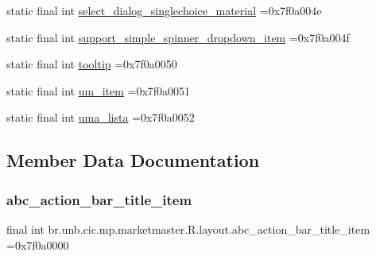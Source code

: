 \begin{DoxyCompactItemize}
\item 
static final int \mbox{\hyperlink{classbr_1_1unb_1_1cic_1_1mp_1_1marketmaster_1_1R_1_1layout_a025d0448cf81d6878b64e51ab758f593}{select\+\_\+dialog\+\_\+singlechoice\+\_\+material}} =0x7f0a004e
\item 
static final int \mbox{\hyperlink{classbr_1_1unb_1_1cic_1_1mp_1_1marketmaster_1_1R_1_1layout_aab7e49c1acca9fdcf3c587500861830a}{support\+\_\+simple\+\_\+spinner\+\_\+dropdown\+\_\+item}} =0x7f0a004f
\item 
static final int \mbox{\hyperlink{classbr_1_1unb_1_1cic_1_1mp_1_1marketmaster_1_1R_1_1layout_a1d2502abddc92a65cce33090859334ae}{tooltip}} =0x7f0a0050
\item 
static final int \mbox{\hyperlink{classbr_1_1unb_1_1cic_1_1mp_1_1marketmaster_1_1R_1_1layout_a4d6e586bee5d7224e2622898043a77c9}{um\+\_\+item}} =0x7f0a0051
\item 
static final int \mbox{\hyperlink{classbr_1_1unb_1_1cic_1_1mp_1_1marketmaster_1_1R_1_1layout_ac184cd4c6a865b6bb98bbc9eb0930937}{uma\+\_\+lista}} =0x7f0a0052
\end{DoxyCompactItemize}


\subsection{Member Data Documentation}
\mbox{\label{classbr_1_1unb_1_1cic_1_1mp_1_1marketmaster_1_1R_1_1layout_abb300bac2183fcb747a8d5a79fbac7f8}} 
\subsubsection{\texorpdfstring{abc\+\_\+action\+\_\+bar\+\_\+title\+\_\+item}{abc\_action\_bar\_title\_item}}
{\footnotesize\ttfamily final int br.\+unb.\+cic.\+mp.\+marketmaster.\+R.\+layout.\+abc\+\_\+action\+\_\+bar\+\_\+title\+\_\+item =0x7f0a0000\hspace{0.3cm}{\ttfamily [static]}}

\mbox{\label{classbr_1_1unb_1_1cic_1_1mp_1_1marketmaster_1_1R_1_1layout_ad004bb203232a2e36c5d6f87bba911af}} 
